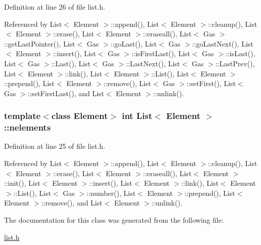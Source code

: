Definition at line 26 of file list.h.

Referenced by List$<$ Element $>$::append(), List$<$ Element $>$::cleanup(), List$<$ Element $>$::erase(), List$<$ Element $>$::eraseall(), List$<$ Gas $>$::getLastPointer(), List$<$ Gas $>$::goLast(), List$<$ Gas $>$::goLastNext(), List$<$ Element $>$::insert(), List$<$ Gas $>$::isFirstLast(), List$<$ Gas $>$::isLast(), List$<$ Gas $>$::Last(), List$<$ Gas $>$::LastNext(), List$<$ Gas $>$::LastPrev(), List$<$ Element $>$::link(), List$<$ Element $>$::List(), List$<$ Element $>$::prepend(), List$<$ Element $>$::remove(), List$<$ Gas $>$::setFirst(), List$<$ Gas $>$::setFirstLast(), and List$<$ Element $>$::unlink().\hypertarget{classList_60ebdaf4722b1bb0f7f800d3491de16d}{
\subsubsection[{nelements}]{\setlength{\rightskip}{0pt plus 5cm}template$<$class Element$>$ int {\bf List}$<$ Element $>$::{\bf nelements}}}
\label{classList_60ebdaf4722b1bb0f7f800d3491de16d}




Definition at line 25 of file list.h.

Referenced by List$<$ Element $>$::append(), List$<$ Element $>$::cleanup(), List$<$ Element $>$::erase(), List$<$ Element $>$::eraseall(), List$<$ Element $>$::init(), List$<$ Element $>$::insert(), List$<$ Element $>$::link(), List$<$ Element $>$::List(), List$<$ Gas $>$::number(), List$<$ Element $>$::prepend(), List$<$ Element $>$::remove(), and List$<$ Element $>$::unlink().

The documentation for this class was generated from the following file:\begin{CompactItemize}
\item 
\hyperlink{list_8h}{list.h}\end{CompactItemize}
